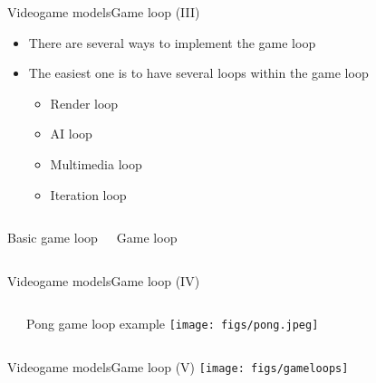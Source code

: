 \documentclass[10pt,compress]{beamer} %
\begin{document}
\begin{frame}{Videogame models}{Game loop (III)}
	\begin{itemize}
	   	\item There are several ways to implement the game loop
	   	\item The easiest one is to have several loops within the game loop
		\begin{itemize}
			\item Render loop
			\item AI loop
			\item Multimedia loop
			\item Iteration loop
		\end{itemize}
	\end{itemize}

    \begin{columns}
    \begin{block}{Basic game loop}
	    \vspace{-0.2cm}
	    
		\vspace{-0.2cm}
	\end{block}
    \begin{block}{Game loop}
	    \vspace{-0.2cm}
	    
		\vspace{-0.2cm}
	\end{block}
	\end{columns}
\end{frame}

\begin{frame}{Videogame models}{Game loop (IV)}
	    \vspace{-0.3cm}
    \begin{columns}
    \begin{block}{}
	    \vspace{-0.2cm}
	    
		\vspace{-0.2cm}
	\end{block}
   	Pong game loop example
	\centering\texttt{[image: figs/pong.jpeg]}
	\end{columns}
\end{frame}

\begin{frame}[plain]{Videogame models}{Game loop (V)}
	\centering\texttt{[image: figs/gameloops]}
\end{frame}
\end{document}
